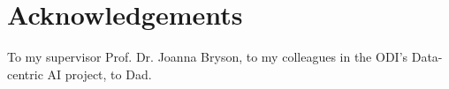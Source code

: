 \chapter*{Acknowledgements}

To my supervisor Prof. Dr. Joanna Bryson, to my colleagues in the ODI's Data-centric AI project, to Dad.

